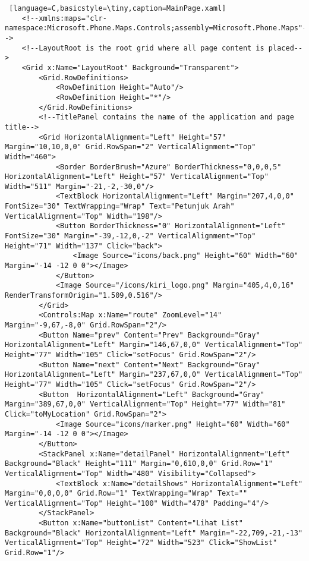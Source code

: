 \begin{lstlisting} [language=C,basicstyle=\tiny,caption=MainPage.xaml]
    <!--xmlns:maps="clr-namespace:Microsoft.Phone.Maps.Controls;assembly=Microsoft.Phone.Maps"-->
    <!--LayoutRoot is the root grid where all page content is placed-->
    <Grid x:Name="LayoutRoot" Background="Transparent">
        <Grid.RowDefinitions>
            <RowDefinition Height="Auto"/>
            <RowDefinition Height="*"/>
        </Grid.RowDefinitions>
        <!--TitlePanel contains the name of the application and page title-->
        <Grid HorizontalAlignment="Left" Height="57" Margin="10,10,0,0" Grid.RowSpan="2" VerticalAlignment="Top" Width="460">
            <Border BorderBrush="Azure" BorderThickness="0,0,0,5" HorizontalAlignment="Left" Height="57" VerticalAlignment="Top" Width="511" Margin="-21,-2,-30,0"/>
            <TextBlock HorizontalAlignment="Left" Margin="207,4,0,0" FontSize="30" TextWrapping="Wrap" Text="Petunjuk Arah" VerticalAlignment="Top" Width="198"/>
            <Button BorderThickness="0" HorizontalAlignment="Left" FontSize="30" Margin="-39,-12,0,-2" VerticalAlignment="Top" Height="71" Width="137" Click="back">
                <Image Source="icons/back.png" Height="60" Width="60" Margin="-14 -12 0 0"></Image>
            </Button>    
            <Image Source="/icons/kiri_logo.png" Margin="405,4,0,16" RenderTransformOrigin="1.509,0.516"/>
        </Grid>
        <Controls:Map x:Name="route" ZoomLevel="14" Margin="-9,67,-8,0" Grid.RowSpan="2"/>
        <Button Name="prev" Content="Prev" Background="Gray" HorizontalAlignment="Left" Margin="146,67,0,0" VerticalAlignment="Top" Height="77" Width="105" Click="setFocus" Grid.RowSpan="2"/>
        <Button Name="next" Content="Next" Background="Gray" HorizontalAlignment="Left" Margin="237,67,0,0" VerticalAlignment="Top" Height="77" Width="105" Click="setFocus" Grid.RowSpan="2"/>
        <Button  HorizontalAlignment="Left" Background="Gray" Margin="389,67,0,0" VerticalAlignment="Top" Height="77" Width="81" Click="toMyLocation" Grid.RowSpan="2">
            <Image Source="icons/marker.png" Height="60" Width="60" Margin="-14 -12 0 0"></Image>
        </Button>
        <StackPanel x:Name="detailPanel" HorizontalAlignment="Left" Background="Black" Height="111" Margin="0,610,0,0" Grid.Row="1" VerticalAlignment="Top" Width="480" Visibility="Collapsed">
            <TextBlock x:Name="detailShows" HorizontalAlignment="Left" Margin="0,0,0,0" Grid.Row="1" TextWrapping="Wrap" Text="" VerticalAlignment="Top" Height="100" Width="478" Padding="4"/>
        </StackPanel>
        <Button x:Name="buttonList" Content="Lihat List" Background="Black" HorizontalAlignment="Left" Margin="-22,709,-21,-13" VerticalAlignment="Top" Height="72" Width="523" Click="ShowList" Grid.Row="1"/>

\end{lstlisting}

